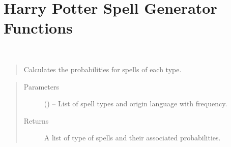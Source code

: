 \documentclass[letterpaper,10pt,english]{sphinxmanual}
\begin{document}
\section{Harry Potter Spell Generator Functions}
\label{code:module-hp_spells}\label{code:harry-potter-spell-generator-functions}\label{code::doc}

\begin{fulllineitems}
\label{code:hp_spells.calcProb}~\begin{quote}

Calculates the probabilities for spells of each type.
\end{quote}
\begin{quote}\begin{description}
\item[{Parameters}] \leavevmode
{} (\sphinxstyleliteralemphasis{}\sphinxstyleliteralemphasis{{[}}\sphinxstyleliteralemphasis{}\sphinxstyleliteralemphasis{{[}}\sphinxstyleliteralemphasis{}\sphinxstyleliteralemphasis{{[}}\sphinxstyleliteralemphasis{, }\sphinxstyleliteralemphasis{{]}}\sphinxstyleliteralemphasis{}\sphinxstyleliteralemphasis{, }\sphinxstyleliteralemphasis{{]}}\sphinxstyleliteralemphasis{{]}}\sphinxstyleliteralemphasis{}) -- List of spell types and origin language with frequency.

\item[{Returns}] \leavevmode
A list of type of spells and their associated probabilities.

\end{description}\end{quote}

\end{fulllineitems}

\end{document}
